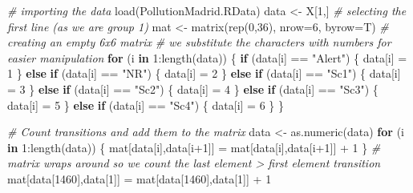 \documentclass[
]{article}
\newenvironment{Shaded}{\begin{snugshade}}{\end{snugshade}}
\newcommand{\AttributeTok}[1]{\textcolor[rgb]{0.77,0.63,0.00}{#1}}
\newcommand{\CommentTok}[1]{\textcolor[rgb]{0.56,0.35,0.01}{\textit{#1}}}
\newcommand{\ControlFlowTok}[1]{\textcolor[rgb]{0.13,0.29,0.53}{\textbf{#1}}}
\newcommand{\DecValTok}[1]{\textcolor[rgb]{0.00,0.00,0.81}{#1}}
\newcommand{\FunctionTok}[1]{\textcolor[rgb]{0.00,0.00,0.00}{#1}}
\newcommand{\NormalTok}[1]{#1}
\newcommand{\OtherTok}[1]{\textcolor[rgb]{0.56,0.35,0.01}{#1}}
\newcommand{\SpecialCharTok}[1]{\textcolor[rgb]{0.00,0.00,0.00}{#1}}
\newcommand{\StringTok}[1]{\textcolor[rgb]{0.31,0.60,0.02}{#1}}
\begin{document}
\begin{Shaded}
\begin{Highlighting}[]
\CommentTok{\# importing the data}
\FunctionTok{load}\NormalTok{(}\StringTok{\textquotesingle{}PollutionMadrid.RData\textquotesingle{}}\NormalTok{)}
\NormalTok{data }\OtherTok{\textless{}{-}}\NormalTok{  X[}\DecValTok{1}\NormalTok{,] }\CommentTok{\# selecting the first line (as we are group 1)}
\NormalTok{mat }\OtherTok{\textless{}{-}} \FunctionTok{matrix}\NormalTok{(}\FunctionTok{rep}\NormalTok{(}\DecValTok{0}\NormalTok{,}\DecValTok{36}\NormalTok{), }\AttributeTok{nrow=}\DecValTok{6}\NormalTok{, }\AttributeTok{byrow=}\NormalTok{T) }\CommentTok{\# creating an empty 6x6 matrix}
\CommentTok{\# we substitute the characters with numbers for easier manipulation}
\ControlFlowTok{for}\NormalTok{ (i }\ControlFlowTok{in} \DecValTok{1}\SpecialCharTok{:}\FunctionTok{length}\NormalTok{(data)) \{}
  \ControlFlowTok{if}\NormalTok{ (data[i] }\SpecialCharTok{==} \StringTok{"Alert"}\NormalTok{) \{}
\NormalTok{    data[i] }\OtherTok{=} \DecValTok{1}
\NormalTok{  \} }\ControlFlowTok{else} \ControlFlowTok{if}\NormalTok{ (data[i] }\SpecialCharTok{==} \StringTok{"NR"}\NormalTok{) \{}
\NormalTok{    data[i] }\OtherTok{=} \DecValTok{2}
\NormalTok{  \} }\ControlFlowTok{else} \ControlFlowTok{if}\NormalTok{ (data[i] }\SpecialCharTok{==} \StringTok{"Sc1"}\NormalTok{) \{}
\NormalTok{    data[i] }\OtherTok{=} \DecValTok{3}
\NormalTok{  \} }\ControlFlowTok{else} \ControlFlowTok{if}\NormalTok{ (data[i] }\SpecialCharTok{==} \StringTok{"Sc2"}\NormalTok{) \{}
\NormalTok{    data[i] }\OtherTok{=} \DecValTok{4} 
\NormalTok{  \} }\ControlFlowTok{else} \ControlFlowTok{if}\NormalTok{ (data[i] }\SpecialCharTok{==} \StringTok{"Sc3"}\NormalTok{) \{}
\NormalTok{    data[i] }\OtherTok{=} \DecValTok{5}
\NormalTok{  \} }\ControlFlowTok{else} \ControlFlowTok{if}\NormalTok{ (data[i] }\SpecialCharTok{==} \StringTok{"Sc4"}\NormalTok{) \{}
\NormalTok{    data[i] }\OtherTok{=} \DecValTok{6}
\NormalTok{  \}}
\NormalTok{\}}

\CommentTok{\# Count transitions and add them to the matrix}
\NormalTok{data }\OtherTok{\textless{}{-}} \FunctionTok{as.numeric}\NormalTok{(data)}
\ControlFlowTok{for}\NormalTok{ (i }\ControlFlowTok{in} \DecValTok{1}\SpecialCharTok{:}\FunctionTok{length}\NormalTok{(data)) \{}
\NormalTok{  mat[data[i],data[i}\SpecialCharTok{+}\DecValTok{1}\NormalTok{]] }\OtherTok{=}\NormalTok{ mat[data[i],data[i}\SpecialCharTok{+}\DecValTok{1}\NormalTok{]] }\SpecialCharTok{+} \DecValTok{1}
\NormalTok{\}}
\CommentTok{\# matrix wraps around so we count the last element \textgreater{} first element transition}
\NormalTok{mat[data[}\DecValTok{1460}\NormalTok{],data[}\DecValTok{1}\NormalTok{]] }\OtherTok{=}\NormalTok{ mat[data[}\DecValTok{1460}\NormalTok{],data[}\DecValTok{1}\NormalTok{]] }\SpecialCharTok{+} \DecValTok{1}


\end{Highlighting}
\end{Shaded}
\end{document}
